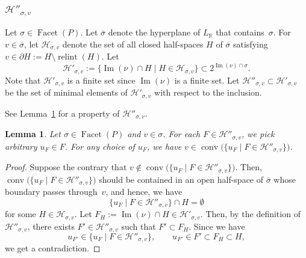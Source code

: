 \documentclass[11pt]{article}
\newtheorem{lem}[theo]{Lemma}
\theoremstyle{definition}
\numberwithin{equation}{section}
\begin{document}
\subsubsection{$\mathcal{H}''_{\sigma, v}$}\label{subsubsection:H}
\begin{defn}
Let $\sigma \in \operatorname{Facet}(P)$. 
Let $\overline{\sigma}$ denote the hyperplane of $L_{\mathbb{R}}$ that contains~$\sigma$. 
For $v \in \overline{\sigma}$, let $\mathcal{H}_{\sigma, v}$ denote the set of all closed half-spaces $H$ of 
$\overline{\sigma}$ satisfying $v \in \partial H := H  \setminus \operatorname{relint}(H)$. 
Let 
\[
\mathcal{H}' _{\sigma, v} := \{ \operatorname{Im}(\nu) \cap H \mid H \in \mathcal{H}_{\sigma, v} \} 
\subset 2 ^{\operatorname{Im}(\nu) \cap \sigma}. 
\]
Note that $\mathcal{H}' _{\sigma, v}$ is a finite set since $\operatorname{Im}(\nu)$ is a finite set. 
Let $\mathcal{H}'' _{\sigma, v} \subset \mathcal{H}' _{\sigma, v}$ 
be the set of minimal elements of $\mathcal{H}' _{\sigma, v}$ with respect to the inclusion. 
\end{defn}

See Lemma~\ref{lem:H} for a property of $\mathcal{H}'' _{\sigma, v}$. 

\begin{lem}\label{lem:H}
Let $\sigma \in \operatorname{Facet}(P)$ and $v \in \sigma$. 
For each $F \in \mathcal{H}'' _{\sigma, v}$, we pick arbitrary $u_F \in F$. 
For any choice of $u_F$, we have $v \in \operatorname{conv}\bigl ( \{ u_F \mid F \in \mathcal{H}'' _{\sigma, v} \} \bigr)$. 
\end{lem}
\begin{proof}
Suppose the contrary that $v \not \in \operatorname{conv}\bigl ( \{ u_F \mid F \in \mathcal{H}'' _{\sigma, v} \} \bigr)$. 
Then, $\operatorname{conv}\bigl ( \{ u_F \mid F \in \mathcal{H}'' _{\sigma, v} \} \bigr)$ 
should be contained in an open half-space of $\overline{\sigma}$ whose boundary passes through~$v$, 
and hence, we have
\[
\{ u_F \mid F \in \mathcal{H}'' _{\sigma, v} \} \cap H = \emptyset
\]
for some $H \in \mathcal{H}_{\sigma, v}$. 
Let $F_H := \operatorname{Im}(\nu) \cap H \in \mathcal{H}' _{\sigma, v}$. 
Then, by the definition of $\mathcal{H}'' _{\sigma, v}$, there exists $F' \in \mathcal{H}'' _{\sigma, v}$ such that $F' \subset F_H$.
Since we have 
\[
u_{F'} \in \{ u_F \mid F \in \mathcal{H}'' _{\sigma, v} \}, \qquad 
u_{F'} \in F' \subset F_H \subset H, 
\]
we get a contradiction. 
\end{proof}
\end{document}
